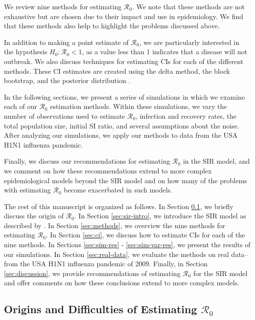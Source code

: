 \documentclass[12pt]{article}
\newcommand{\wxxsir}{nine } %
\newcommand{\rr}{\ensuremath{\mathcal{R}_0}}
\begin{document}
We review \wxxsir methods for estimating $\rr$.  We note that these methods are not exhaustive but are chosen due to their impact and use in epidemiology.  We find that these methods also help to highlight the problems discussed above.

In addition to making a point estimate of $\rr$, we are particularly interested in the hypothesis  $H_0: \rr < 1$, as a value less than 1 indicates that a disease will not outbreak.  We also discuss techniques for estimating CIs for each of the different methods.  These CI estimates are created using the delta method, the block bootstrap, and the posterior distribution \citep{cao1999,wasserman2004}.

In the following sections, we present a series of simulations in which we examine each of our $\rr$ estimation methods.  Within these simulations, we vary the number of observations used to estimate $\rr$, infection and recovery rates, the total population size, initial SI ratio, and several assumptions about the noise.  After analyzing our simulations, we apply our methods to data from the USA H1N1 influenza pandemic.


Finally, we discuss our recommendations for estimating $\rr$ in the SIR model, and we comment on how these recommendations extend to more complex epidemiological models beyond the SIR model and on how many of the problems with estimating $\rr$  become exacerbated in such models.


The rest of this manuscript is organized as follows.  In Section \ref{sec:r0}, we briefly discuss the origin of $\rr$.  In Section \ref{sec:sir-intro}, we introduce the SIR model as described by \cite{Kermack700}.  In Section \ref{sec:methods}, we overview the \wxxsir methods for estimating $\rr$. In Section \ref{sec:ci}, we discuss how to estimate CIs for each of the \wxxsir methods.  In Sections \ref{sec:sim-res} - \ref{sec:sim-var-res}, we present the results of our simulations.  In Section \ref{sec:real-data}, we evaluate the methods on real data--from the USA H1N1 influenza pandemic of 2009.  Finally, in Section \ref{sec:discussion}, we provide recommendations of estimating $\rr$ for the SIR model and offer comments on how these conclusions extend to more complex models.


\subsection{Origins and Difficulties of Estimating $\rr$}
\label{sec:r0}
\end{document}
